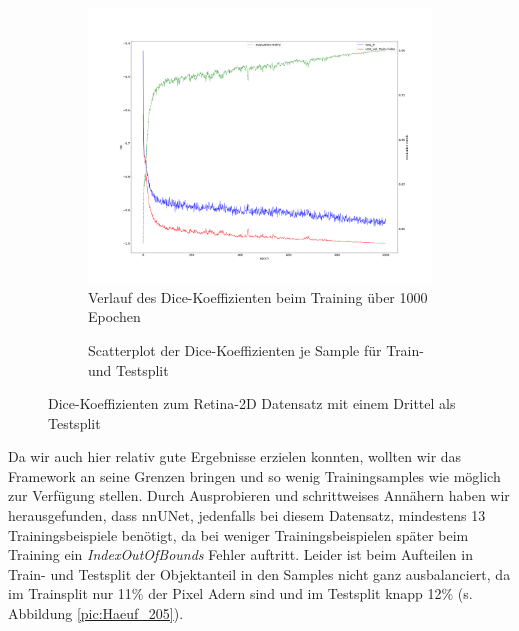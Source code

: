 \begin{figure}[H]
\centering
\begin{minipage}{.6\textwidth}
\begin{subfigure}{\textwidth}
\centering
\includegraphics[width=\textwidth]{Pictures/nnUnet/Praxis/Task203-Augen-drittel-testsplit/progress_203-Augen-drittel-split.png}
\caption{Verlauf des Dice-Koeffizienten beim Training über 1000 Epochen}
\label{pic:Prog_203}
\end{subfigure}
\end{minipage}%
\begin{minipage}{.4\textwidth}
\begin{subfigure}{\textwidth}

\caption{Scatterplot der Dice-Koeffizienten je Sample für Train- und Testsplit}
\label{pic:Dice_203}
\end{subfigure}
\end{minipage}

\caption{Dice-Koeffizienten zum Retina-2D Datensatz mit einem Drittel als Testsplit}
\end{figure}

Da wir auch hier relativ gute Ergebnisse erzielen konnten, wollten wir das Framework an seine Grenzen bringen und so wenig Trainingsamples wie möglich zur Verfügung stellen. Durch Ausprobieren und schrittweises Annähern haben wir herausgefunden, dass nnUNet, jedenfalls bei diesem Datensatz, mindestens 13 Trainingsbeispiele benötigt, da bei weniger Trainingsbeispielen später beim Training ein \textit{IndexOutOfBounds} Fehler auftritt. Leider ist beim Aufteilen in Train- und Testsplit der Objektanteil in den Samples nicht ganz ausbalanciert, da im Trainsplit nur 11\% der Pixel Adern sind und im Testsplit knapp 12\% (s. Abbildung \ref{pic:Haeuf_205}).


